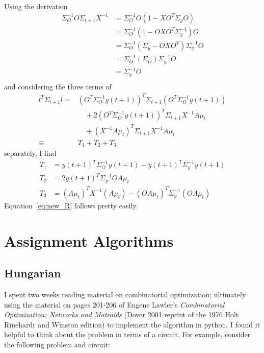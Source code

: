 \documentclass[11pt]{article}
\newcommand{\ti}[2]{{#1}{(#2)}}                         %
\begin{document}
Using the derivation
\begin{align*}
  \Sigma_O^{-1} O \Sigma_{t+1} X^{-1} &=
  \Sigma_O^{-1}O(1-XO^T\Sigma_yO) \\
  &= \Sigma_O^{-1}(1-OXO^T\Sigma_y^{-1})O \\
  &= \Sigma_O^{-1}(\Sigma_y-OXO^T)\Sigma_y^{-1}O \\
  &= \Sigma_O^{-1}(\Sigma_O)\Sigma_y^{-1}O \\
  &= \Sigma_y^{-1}O \\
\end{align*}
and considering the three terms of
\begin{align*}
  l^T \Sigma_{t+1} l = & (O^T\Sigma_O^{-1} \ti{y}{t+1})^T \Sigma_{t+1}
  (O^T\Sigma_O^{-1} \ti{y}{t+1}) \\
  & \quad + 2(O^T\Sigma_O^{-1} \ti{y}{t+1})^T \Sigma_{t+1} X^{-1}A\mu_t \\
  & \quad + (X^{-1}A\mu_t)^T\Sigma_{t+1} X^{-1}A\mu_t \\
  \equiv & T_1+T_2+T_3
\end{align*}
separately, I find
\begin{align*}
  T_1 &= \ti{y}{t+1}^T \Sigma_O^{-1} \ti{y}{t+1} - \ti{y}{t+1}^T
  \Sigma_y^{-1} \ti{y}{t+1} \\
  T_2 &= 2 \ti{y}{t+1}^T \Sigma_y^{-1} OA\mu_t \\
  T_3 &= (A\mu_t)^T X^{-1} (A\mu_t) - (OA\mu_t)^T
  \Sigma_y^{-1}(OA\mu_t)
\end{align*}
Equation~\eqref{eq:new_R} follows pretty easily.

\section{Assignment Algorithms}
\label{sec:assignment}

\subsection{Hungarian}
\label{sec:hungarian}

I spent two weeks reading material on combinatorial optimization;
ultimately using the material on pages 201-206 of Eugene Lawler's
\emph{Combinatorial Optimization: Networks and Matroids} (Dover 2001
reprint of the 1976 Holt Rinehardt and Winston edition) to implement
the algorithm in python.  I found it helpful to think about the
problem in terms of a circuit.  For example, consider the following
problem and circuit:
\end{document}
